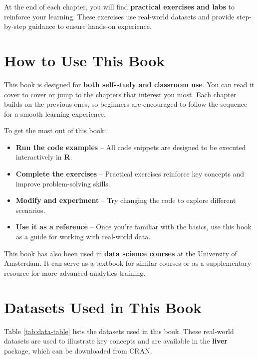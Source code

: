 \documentclass[
]{book}
\providecommand{\tightlist}{%
  \setlength{\itemsep}{0pt}\setlength{\parskip}{0pt}}
\theoremstyle{definition}
\theoremstyle{definition}
\theoremstyle{definition}
\theoremstyle{definition}
\theoremstyle{remark}
\begin{document}
At the end of each chapter, you will find \textbf{practical exercises and labs} to reinforce your learning. These exercises use real-world datasets and provide step-by-step guidance to ensure hands-on experience.

\section*{How to Use This Book}\label{how-to-use-this-book}

This book is designed for \textbf{both self-study and classroom use}. You can read it cover to cover or jump to the chapters that interest you most. Each chapter builds on the previous ones, so beginners are encouraged to follow the sequence for a smooth learning experience.

To get the most out of this book:

\begin{itemize}
\tightlist
\item
  \textbf{Run the code examples} -- All code snippets are designed to be executed interactively in \textbf{R}.\\
\item
  \textbf{Complete the exercises} -- Practical exercises reinforce key concepts and improve problem-solving skills.\\
\item
  \textbf{Modify and experiment} -- Try changing the code to explore different scenarios.\\
\item
  \textbf{Use it as a reference} -- Once you're familiar with the basics, use this book as a guide for working with real-world data.
\end{itemize}

This book has also been used in \textbf{data science courses} at the University of Amsterdam. It can serve as a textbook for similar courses or as a supplementary resource for more advanced analytics training.

\section*{Datasets Used in This Book}\label{datasets-used-in-this-book}

Table \ref{tab:data-table} lists the datasets used in this book. These real-world datasets are used to illustrate key concepts and are available in the \textbf{liver} package, which can be downloaded from CRAN.
\end{document}
